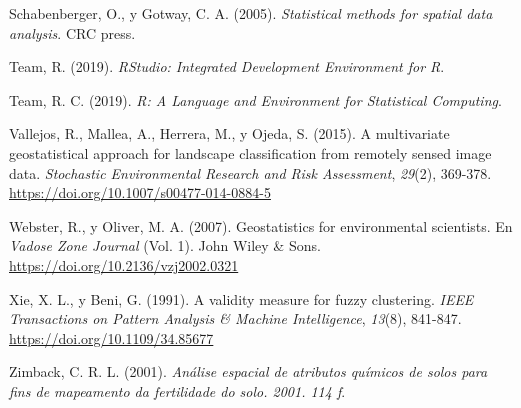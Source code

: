 \documentclass[11pt,b5paper,]{krantz}
\begin{document}
\leavevmode\hypertarget{ref-Schabenberger_Gotway_2005}{}%
Schabenberger, O., y Gotway, C. A. (2005). \emph{Statistical methods for spatial data analysis}. CRC press.

\leavevmode\hypertarget{ref-RStudio_Team_2019}{}%
Team, R. (2019). \emph{RStudio: Integrated Development Environment for R}.

\leavevmode\hypertarget{ref-R_Core_Team_2019}{}%
Team, R. C. (2019). \emph{R: A Language and Environment for Statistical Computing}.

\leavevmode\hypertarget{ref-Vallejos2015}{}%
Vallejos, R., Mallea, A., Herrera, M., y Ojeda, S. (2015). A multivariate geostatistical approach for landscape classification from remotely sensed image data. \emph{Stochastic Environmental Research and Risk Assessment}, \emph{29}(2), 369-378. \url{https://doi.org/10.1007/s00477-014-0884-5}

\leavevmode\hypertarget{ref-Webster_Oliver_2007}{}%
Webster, R., y Oliver, M. A. (2007). Geostatistics for environmental scientists. En \emph{Vadose Zone Journal} (Vol. 1). John Wiley \& Sons. \url{https://doi.org/10.2136/vzj2002.0321}

\leavevmode\hypertarget{ref-Xie_Beni_1991}{}%
Xie, X. L., y Beni, G. (1991). A validity measure for fuzzy clustering. \emph{IEEE Transactions on Pattern Analysis \& Machine Intelligence}, \emph{13}(8), 841-847. \url{https://doi.org/10.1109/34.85677}

\leavevmode\hypertarget{ref-Zimback_2001}{}%
Zimback, C. R. L. (2001). \emph{Análise espacial de atributos químicos de solos para fins de mapeamento da fertilidade do solo. 2001. 114 f}.

\backmatter
\printindex
\end{document}
